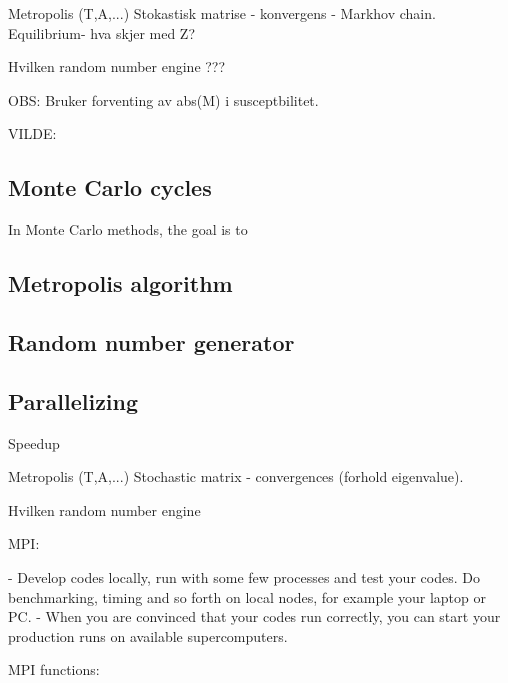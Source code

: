 
Metropolis (T,A,...)
	Stokastisk matrise  - konvergens - Markhov chain.
		Equilibrium- hva skjer med Z?
		
	Hvilken random number engine ??? 

	
	OBS: Bruker forventing av abs(M) i susceptbilitet. 



VILDE: 


\subsection{Monte Carlo cycles}

In Monte Carlo methods, the goal is to 





\subsection{Metropolis algorithm}

\subsection{Random number generator}

\subsection{Parallelizing}

Speedup

Metropolis (T,A,...)
Stochastic matrix  - convergences (forhold eigenvalue).

Hvilken random number engine

MPI:	

- Develop codes locally, run with some few processes and test your codes. Do benchmarking, timing and so forth on local nodes, for example your laptop or PC.
- When you are convinced that your codes run correctly, you can start your production runs on available supercomputers.


MPI functions:
%
%
%
%
%
%
%
